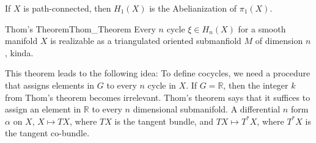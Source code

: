 \documentclass[crop=false,class=book,oneside]{standalone}
\begin{document}
        If $X$ is path-connected, then $H_{1}(X)$ is the
        Abelianization of $\pi_{1}(X)$.
        \begin{ltheorem}{Thom's Theorem}{Thom_Theorem}
            Every $n$ cycle $\xi\in{H}_{n}(X)$ for a
            smooth manifold $X$ is realizable as a
            triangulated oriented submanfiold $M$ of
            dimension $n$, kinda.
        \end{ltheorem}
        This theorem leads to the following idea:
        To define cocycles, we need a procedure that
        assigns elements in $G$ to every $n$ cycle in
        $X$. If $G=\mathbb{R}$, then the integer $k$ from
        Thom's theorem becomes irrelevant. Thom's theorem
        says that it suffices to assign an element in
        $\mathbb{R}$ to every $n$ dimensional submanifold.
        A differential $n$ form $\alpha$ on $X$,
        $X\mapsto{TX}$, where $TX$ is the tangent bundle,
        and $TX\mapsto{T^{*}}X$, where $T^{*}X$ is the
        tangent co-bundle. 
\end{document}
